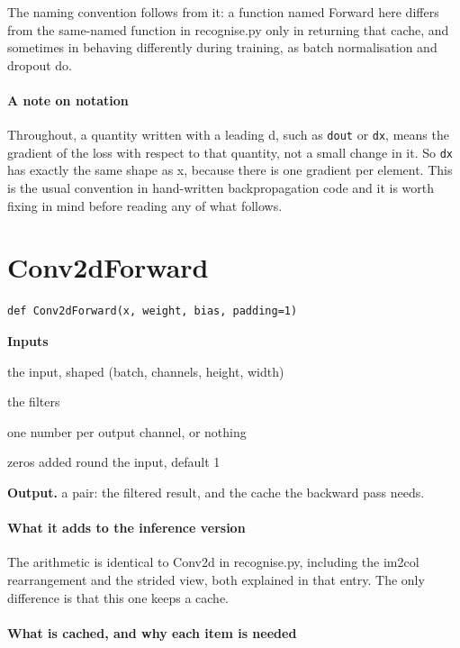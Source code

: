 The naming convention follows from it: a function named Forward here differs from the same-named function in recognise.py only in returning that cache, and sometimes in behaving differently during training, as batch normalisation and dropout do.


\paragraph{A note on notation}
Throughout, a quantity written with a leading d, such as \texttt{dout} or \texttt{dx}, means the gradient of the loss with respect to that quantity, not a small change in it. So \texttt{dx} has exactly the same shape as x, because there is one gradient per element. This is the usual convention in hand-written backpropagation code and it is worth fixing in mind before reading any of what follows.


\section{Conv2dForward}
\begin{lstlisting}[style=sig]
def Conv2dForward(x, weight, bias, padding=1)
\end{lstlisting}

\noindent\textbf{Inputs}
\begin{description}[leftmargin=2.2em,style=nextline,font=\normalfont\ttfamily]\setlength\itemsep{1pt}
  \item[{x}] \normalfont the input, shaped (batch, channels, height, width)
  \item[{weight}] \normalfont the filters
  \item[{bias}] \normalfont one number per output channel, or nothing
  \item[{padding}] \normalfont zeros added round the input, default 1
\end{description}

\noindent\textbf{Output.} a pair: the filtered result, and the cache the backward pass needs.


\paragraph{What it adds to the inference version}
The arithmetic is identical to Conv2d in recognise.py, including the im2col rearrangement and the strided view, both explained in that entry. The only difference is that this one keeps a cache.


\paragraph{What is cached, and why each item is needed}

